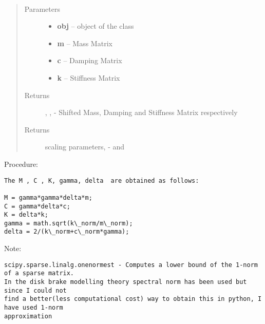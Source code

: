\documentclass[letterpaper,10pt,english]{sphinxmanual}
\begin{document}
\begin{fulllineitems}
\label{index:brake.initialize.scale.scale_matrices}~\begin{quote}\begin{description}
\item[{Parameters}] \leavevmode\begin{itemize}
\item {} 
\textbf{obj} -- object of the class 

\item {} 
\textbf{m} -- Mass Matrix

\item {} 
\textbf{c} -- Damping Matrix

\item {} 
\textbf{k} -- Stiffness Matrix

\end{itemize}

\item[{Returns}] \leavevmode
{}, ,  - Shifted Mass, Damping and Stiffness Matrix respectively

\item[{Returns}] \leavevmode
scaling parameters, -  and 

\end{description}\end{quote}

Procedure:

\begin{Verbatim}[commandchars=\\\{\}]
The M , C , K, gamma, delta  are obtained as follows:

M = gamma*gamma*delta*m;
C = gamma*delta*c;
K = delta*k;
gamma = math.sqrt(k\_norm/m\_norm);
delta = 2/(k\_norm+c\_norm*gamma);
\end{Verbatim}

Note:

\begin{Verbatim}[commandchars=\\\{\}]
scipy.sparse.linalg.onenormest - Computes a lower bound of the 1-norm of a sparse matrix.
In the disk brake modelling theory spectral norm has been used but since I could not
find a better(less computational cost) way to obtain this in python, I have used 1-norm
approximation
\end{Verbatim}

\end{fulllineitems}
\end{document}
